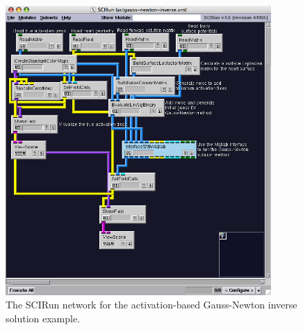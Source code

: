 \begin{figure}[H]
\begin{center}
\includegraphics[width=0.9\textwidth]{ECGToolkitGuide_figures/actgaussnewtonnetwork.png}
\caption{The SCIRun network for the activation-based Gauss-Newton inverse solution example.}
\label{GaussNewtonNetworkExample}
\end{center}
\end{figure}

